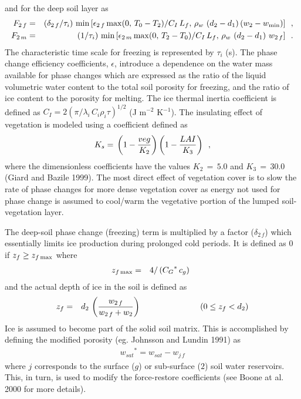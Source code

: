 %
and for the deep soil layer as
%
\begin{eqnarray}
F_{2\,f} &=& \left(\delta_{2\,f}/\tau_i \right)\,{\rm min} \left[
\epsilon_{2\,f} \,{\rm max}(0,\,T_0-T_2)/C_I \, L_f , \,
\rho_w\,\left(d_2-d_1\right)\left( w_2-w_{\rm min}\right)\right]
\,\,\, ,\\
%
F_{2\,m} &=& \left(1/\tau_i \right)\,{\rm min} \left[
\epsilon_{2\,m} \,{\rm max}(0,\,T_2-T_0)/C_I \, L_f , \,
\rho_w\,\left(d_2-d_1\right)\,w_{2\,f}\right]
\,\,\,.
\end{eqnarray}
%
The characteristic time scale for freezing is represented by $\tau_i$ (s).
The phase change efficiency coefficients, $\epsilon$, introduce
a dependence on the water mass available for phase changes
which are expressed as
the ratio of the liquid volumetric water content
to the total soil porosity for freezing,
and the ratio of ice content to the porosity for melting.
The ice thermal inertia coefficient is defined as
$C_I = 2 {\left( {\pi/\lambda_i\,C_i\rho_i\tau} \right)}^{1/2}$
(J m$^{-2}$ K$^{-1}$).
The insulating effect of vegetation is modeled using a coefficient
defined as
%
\begin{eqnarray}
K_s =
\, \left({1-{veg\over K_2}}\right)
\left({1-{LAI\over K_3}}\right) \,\,\,,
\end{eqnarray}
%
where the dimensionless coefficients have
the values $K_2\,=\,5.0$ and $K_3\,=\,30.0$ (Giard and Bazile 1999).
The most direct
effect of vegetation cover
is to slow the rate of phase changes for more dense vegetation cover
as energy not used for phase change is assumed to cool/warm the
vegetative portion of the lumped soil-vegetation layer.

The deep-soil phase change (freezing) term
is multiplied by a factor ($\delta_{2\,f}$)
which essentially limits ice production during prolonged
cold periods.  It is defined as 0 if $z_f \geq z_{f\,{\rm max}}$
where
%
\begin{eqnarray}
z_{f\,{\rm max}} &=& 4/\left( {C_G}^\ast\,c_g\right)
\,\,\,
\end{eqnarray}
and the actual depth of ice in the soil is defined as
\begin{eqnarray}
z_f &=& d_2 \, \left({w_{2\,f}\over w_{2\,f} + w_2}\right)
\hskip1.in \left(0 \leq z_f < d_2\right)
\end{eqnarray}
%
Ice is assumed to become
part of the solid soil matrix. This is accomplished by
defining the modified porosity
(eg. Johnsson and Lundin 1991) as
%
\begin{eqnarray}
{w_{sat}}^\ast = w_{sat} - w_{j\,f}
\end{eqnarray}
%
where $j$ corresponds to the surface ($g$) or sub-surface ($2$)
soil water reservoirs.
This, in turn, is used to modify the force-restore coefficients
(see Boone at al. 2000 for more details).

